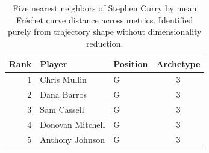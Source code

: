 \begin{table}[htbp]
  \centering\small
  \begin{tabular}{rllc}
    \toprule
    Rank & Player & Position & Archetype \\
    \midrule
    1 & Chris Mullin & G & 3 \\
    2 & Dana Barros & G & 3 \\
    3 & Sam Cassell & G & 3 \\
    4 & Donovan Mitchell & G & 3 \\
    5 & Anthony Johnson & G & 3 \\
    \bottomrule
  \end{tabular}
  \caption{Five nearest neighbors of Stephen Curry by mean Fr\'{e}chet curve distance across metrics. Identified purely from trajectory shape without dimensionality reduction.}
  \label{tab:Stephen_Curry_frechet_curve_neighbors}
\end{table}

